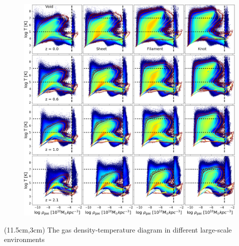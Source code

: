 \documentclass[aspectratio=169]{beamer}
\begin{document}
\begin{frame}[plain,t]
\vspace{-0.3cm}
  \begin{figure}
  \hspace{-3cm}
    \includegraphics[height=\textheight]{RTE-evolution.png}
  \end{figure}
    \begin{textblock*}{4cm}(11.5cm,3cm)
    {The gas density-temperature diagram in different large-scale environments}
    \end{textblock*}
\end{frame}
\end{document}
